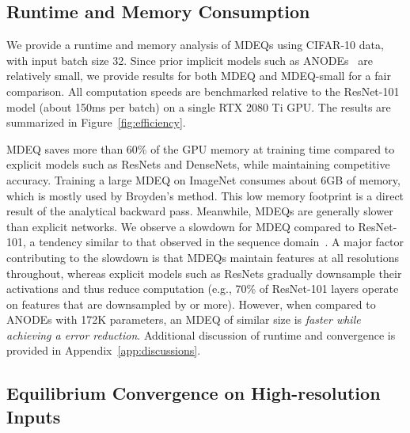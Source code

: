 \documentclass{article}
\begin{document}
\subsection{Runtime and Memory Consumption}

We provide a runtime and memory analysis of MDEQs using CIFAR-10 data, with input batch size 32. Since prior implicit models such as ANODEs~\cite{dupont2019augmented} are relatively small, we provide results for both MDEQ and MDEQ-small for a fair comparison. All computation speeds are benchmarked relative to the ResNet-101 model (about 150ms per batch) on a single RTX 2080 Ti GPU. The results are summarized in Figure~\ref{fig:efficiency}.

MDEQ saves more than 60\% of the GPU memory at training time compared to explicit models such as ResNets and DenseNets, while maintaining competitive accuracy. Training a large MDEQ on ImageNet consumes about 6GB of memory, which is mostly used by Broyden's method. This low memory footprint is a direct result of the analytical backward pass. Meanwhile, MDEQs are generally slower than explicit networks. We observe a  slowdown for MDEQ compared to ResNet-101, a tendency similar to that observed in the sequence domain~\cite{bai2019deep}. A major factor contributing to the slowdown is that MDEQs maintain features at all resolutions throughout, whereas explicit models such as ResNets gradually downsample their activations and thus reduce computation (e.g., 70\% of ResNet-101 layers operate on features that are downsampled by  or more). However, when compared to ANODEs with 172K parameters, an MDEQ of similar size is \emph{ faster while achieving a  error reduction}. Additional discussion of runtime and convergence is provided in Appendix~\ref{app:discussions}.

\subsection{Equilibrium Convergence on High-resolution Inputs}
\end{document}
